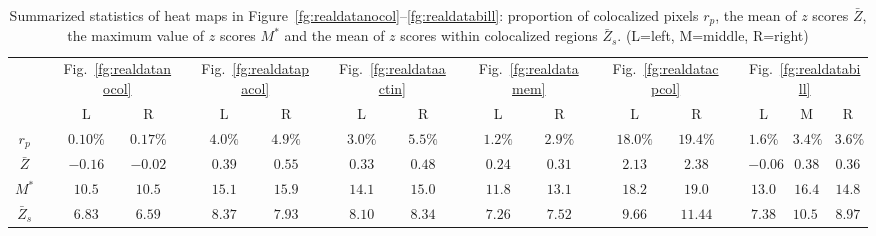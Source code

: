 \documentclass[10pt,twocolumn,twoside]{IEEEtran}
\begin{document}
\begingroup
\renewcommand{\arraystretch}{1.5}
\begin{table*}[!h]
\centering
\begin{tabular}{c c c c c c c c c c c c c c c c c c c c}
\hline
\hline
& & \multicolumn{2}{c}{Fig.~\ref{fg:realdatanocol}} & & \multicolumn{2}{c}{Fig.~\ref{fg:realdatapacol}} & &  \multicolumn{2}{c}{Fig.~\ref{fg:realdataactin}}& &\multicolumn{2}{c}{Fig.~\ref{fg:realdatamem}}& &\multicolumn{2}{c}{Fig.~\ref{fg:realdatacpcol}} & & \multicolumn{3}{c}{Fig.~\ref{fg:realdatabill}}  \\
 \cline{3-4}  \cline{6-7}  \cline{9-10}  \cline{12-13} \cline{15-16} \cline{18-20}
& & L & R & & L & R & & L & R & & L & R & & L & R & & L & M & R \\
\hline
$r_p$ & & $0.10\%$ &  $0.17\%$ & &  $4.0\%$ & $4.9\%$ & &  $3.0\%$ & $5.5\%$ & &  $1.2\%$ & $2.9\%$ & &  $18.0\%$ & $19.4\%$ & & $1.6\%$ & $3.4\%$ & $3.6\%$ \\ 
$\bar{Z}$ & & $-0.16$ &  $-0.02$ & &  $0.39$ & $0.55$ & &  $0.33$ & $0.48$ & &  $0.24$ & $0.31$ & &  $2.13$ & $2.38$ & & $-0.06$ & $0.38$ & $0.36$\\ 
$M^\ast$ & & $10.5$ &  $10.5$ & &  $15.1$ & $15.9$ & &  $14.1$ & $15.0$ & &  $11.8$ & $13.1$ & &  $18.2$ & $19.0$& & $13.0$ & $16.4$ & $14.8$ \\
$\bar{Z}_s$ & & $6.83$ &  $6.59$ & &  $8.37$ & $7.93$ & &  $8.10$ & $8.34$ & &  $7.26$ & $7.52$ & &  $9.66$ & $11.44$& & $7.38$ & $10.59$ & $8.97$ \\
\hline
\hline
\end{tabular}
\caption{Summarized statistics of heat maps in Figure~\ref{fg:realdatanocol}--\ref{fg:realdatabill}: proportion of colocalized pixels $r_p$, the mean of  $z$ scores $\bar{Z}$, the maximum value of $z$ scores $M^\ast$ and  the mean of  $z$ scores within colocalized regions $\bar{Z}_s$. (L=left, M=middle, R=right)}\label{tb:heatmapstat}
\end{table*}
\endgroup
\end{document}
